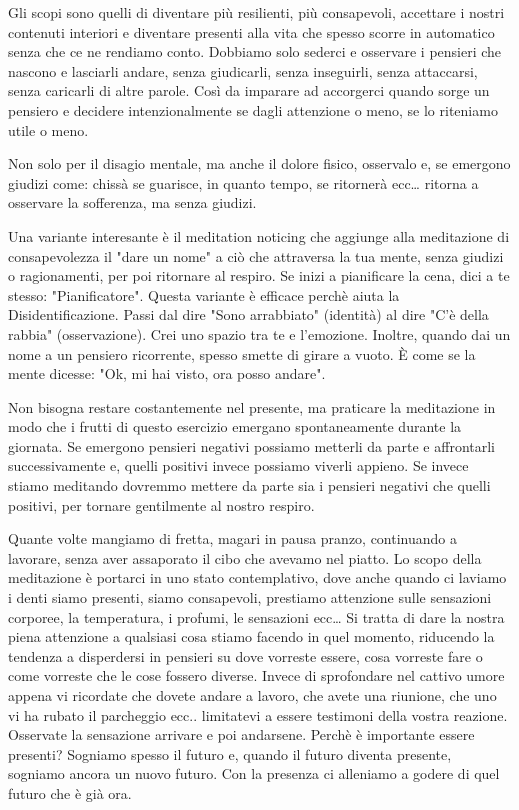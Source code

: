 \documentclass[12pt]{book} %
\begin{document}
Gli scopi sono quelli di diventare più resilienti, più consapevoli, accettare i nostri contenuti interiori e diventare presenti alla vita che spesso scorre in automatico senza che ce ne rendiamo conto. 
Dobbiamo solo sederci e osservare i pensieri che nascono e lasciarli andare, senza giudicarli, senza inseguirli, senza attaccarsi, senza caricarli di altre parole. Così da imparare ad accorgerci quando sorge un pensiero e decidere intenzionalmente se dagli attenzione o meno, se lo riteniamo utile o meno.

Non solo per il disagio mentale, ma anche il dolore fisico, osservalo e, se emergono giudizi come: chissà se guarisce, in quanto tempo, se ritornerà ecc… ritorna a osservare la sofferenza, ma senza giudizi.

Una variante interesante è il meditation noticing che aggiunge alla meditazione di consapevolezza il "dare un nome" a ciò che attraversa la tua mente, senza giudizi o ragionamenti, per poi ritornare al respiro. Se inizi a pianificare la cena, dici a te stesso: "Pianificatore".
Questa variante è efficace perchè aiuta la Disidentificazione. Passi dal dire "Sono arrabbiato" (identità) al dire "C'è della rabbia" (osservazione). Crei uno spazio tra te e l'emozione. Inoltre, quando dai un nome a un pensiero ricorrente, spesso smette di girare a vuoto. È come se la mente dicesse: "Ok, mi hai visto, ora posso andare".

Non bisogna restare costantemente nel presente, ma praticare la meditazione in modo che i frutti di questo esercizio emergano spontaneamente durante la giornata. Se emergono pensieri negativi possiamo metterli da parte e affrontarli successivamente e, quelli positivi invece possiamo viverli appieno. Se invece stiamo meditando dovremmo mettere da parte sia i pensieri negativi che quelli positivi, per tornare gentilmente al nostro respiro.

Quante volte mangiamo di fretta, magari in pausa pranzo, continuando a lavorare, senza aver assaporato il cibo che avevamo nel piatto. Lo scopo della meditazione è portarci in uno stato contemplativo, dove anche quando ci laviamo i denti siamo presenti, siamo consapevoli, prestiamo attenzione sulle sensazioni corporee, la temperatura, i profumi, le sensazioni ecc… Si tratta di dare la nostra piena attenzione a qualsiasi cosa stiamo facendo in quel
momento, riducendo la tendenza a disperdersi in pensieri su dove vorreste essere, cosa vorreste fare o come vorreste che le cose fossero diverse. Invece di sprofondare nel cattivo umore appena vi ricordate che dovete andare a lavoro, che avete una riunione, che uno vi ha rubato il parcheggio ecc.. limitatevi a essere testimoni della vostra reazione. 
Osservate la sensazione arrivare e poi andarsene. 
Perchè è importante essere presenti? Sogniamo spesso il futuro e, quando il futuro diventa presente, sogniamo ancora un nuovo futuro. Con la presenza ci alleniamo a godere di quel futuro che è già ora.
\end{document}
